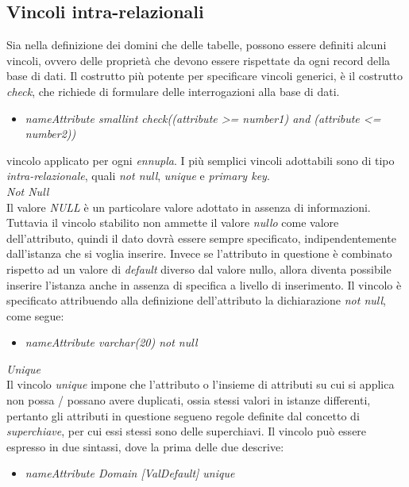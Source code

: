 \documentclass{article}
\begin{document}
\subsection*{Vincoli intra-relazionali}
\large
Sia nella definizione dei domini che delle tabelle, possono essere definiti alcuni vincoli, ovvero delle proprietà che devono essere rispettate da ogni record della base di dati. Il costrutto più potente per specificare vincoli generici, è il costrutto \textit{check}, che richiede di formulare delle interrogazioni alla base di dati.
\begin{itemize}[label={ }, leftmargin=1cm]
    \item \textit{nameAttribute smallint check((attribute >= number1) and (attribute <= number2))}
\end{itemize}
vincolo applicato per ogni \textit{ennupla}. I più semplici vincoli adottabili sono di tipo \textit{intra-relazionale}, quali \textit{not null}, \textit{unique} e \textit{primary key}.\vspace*{14pt}\\
\textit{Not Null}\\Il valore \textit{NULL} è un particolare valore adottato in assenza di informazioni. Tuttavia il vincolo stabilito non ammette il valore \textit{nullo} come valore dell'attributo, quindi il dato dovrà essere sempre specificato, indipendentemente dall'istanza che si voglia inserire. Invece se l'attributo in questione è combinato rispetto ad un valore di \textit{default} diverso dal valore nullo, allora diventa possibile inserire l'istanza anche in assenza di specifica a livello di inserimento. Il vincolo è specificato attribuendo alla definizione dell'attributo la dichiarazione \textit{not null}, come segue:
\begin{itemize}[label={ }, leftmargin=1cm]
    \itemsep0em
    \item \textit{nameAttribute varchar(20) not null}
\end{itemize}
\textit{Unique}\\Il vincolo \textit{unique} impone che l'attributo o l'insieme di attributi su cui si applica non possa / possano avere duplicati, ossia stessi valori in istanze differenti, pertanto gli attributi in questione segueno regole definite dal concetto di \textit{superchiave}, per cui essi stessi sono delle superchiavi. Il vincolo può essere espresso in due sintassi, dove la prima delle due descrive:
\begin{itemize}[label={ }, leftmargin=1cm]
    \item \textit{nameAttribute Domain [ValDefault] unique}
\end{itemize}
\end{document}
